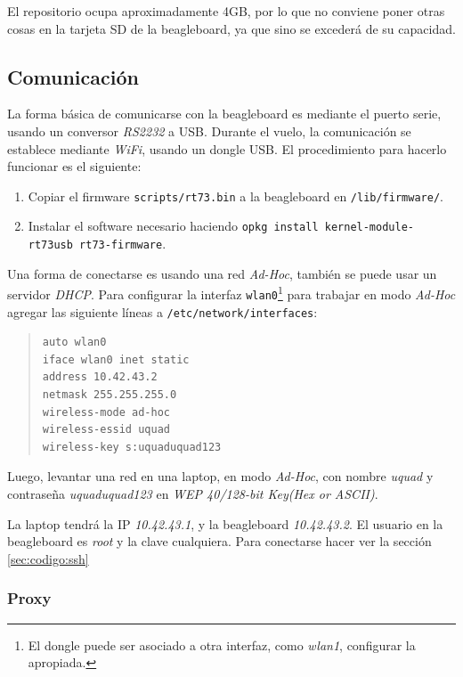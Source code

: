 \documentclass[main]{subfiles}
\begin{document}
El repositorio ocupa aproximadamente 4GB, por lo que no conviene poner otras cosas en la tarjeta SD de la beagleboard, ya que sino se excederá de su capacidad.

\subsection{Comunicación}
\label{sec:codigo:comunicacion}

La forma básica de comunicarse con la beagleboard es mediante el puerto serie, usando un conversor \textit{RS2232} a USB. Durante el vuelo, la comunicación se establece mediante \textit{WiFi}, usando un dongle USB. El procedimiento para hacerlo funcionar es el siguiente:

\begin{enumerate}
\item Copiar el firmware \verb+scripts/rt73.bin+ a la beagleboard en \verb+/lib/firmware/+.
\item Instalar el software necesario haciendo \newline\verb+opkg install kernel-module-rt73usb rt73-firmware+.
\end{enumerate}

Una forma de conectarse es usando una red \textit{Ad-Hoc}, también se puede usar un servidor \textit{DHCP}. Para configurar la interfaz \verb+wlan0+\footnote{El dongle puede ser asociado a otra interfaz, como \textit{wlan1}, configurar la apropiada.} para trabajar en modo \textit{Ad-Hoc} agregar las siguiente líneas a \verb+/etc/network/interfaces+:
\begin{quote}
\begin{verbatim}
auto wlan0
iface wlan0 inet static
address 10.42.43.2
netmask 255.255.255.0
wireless-mode ad-hoc
wireless-essid uquad
wireless-key s:uquaduquad123
\end{verbatim}
\end{quote}

Luego, levantar una red en una laptop, en modo \textit{Ad-Hoc}, con nombre \textit{uquad} y contraseña \textit{uquaduquad123} en \textit{WEP 40/128-bit Key(Hex or ASCII)}.

La laptop tendrá la IP \textit{10.42.43.1}, y la beagleboard \textit{10.42.43.2}. El usuario en la beagleboard es \textit{root} y la clave cualquiera. Para conectarse hacer ver la sección \ref{sec:codigo:ssh}

\subsubsection{Proxy}
\label{sec:codigo:proxy}
\end{document}
